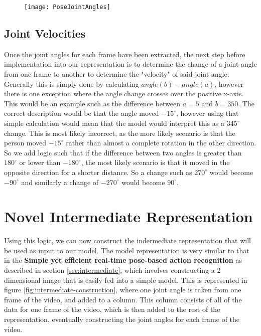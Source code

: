 \begin{figure}[ht]
	\texttt{[image: PoseJointAngles]}
	\centering
	\caption{}
	\label{fig:pose-joint-angles}
\end{figure}

\subsection{Joint Velocities}
\label{sec:joint-velocities}

Once the joint angles for each frame have been extracted, the next step before implementation into our representation is to determine the change of a joint angle from one frame to another to determine the "velocity" of said joint angle. Generally this is simply done by calculating $angle(b) - angle(a)$, however there is one exception where the angle change crosses over the positive x-axis. This would be an example such as the difference between $a = 5$ and $b = 350$. The correct description would be that the angle moved $-15^\circ$, however using that simple calculation would mean that the model would interpret this as a $345^\circ$ change. This is most likely incorrect, as the more likely scenario is that the person moved $-15^\circ$ rather than almost a complete rotation in the other direction. So we add logic such that if the difference between two angles is greater than $180^\circ$ or lower than $-180^\circ$, the most likely scenario is that it moved in the opposite direction for a shorter distance. So a change such as $270^\circ$ would become $-90^\circ$ and similarly a change of $-270^\circ$ would become $90^\circ$.

\section{Novel Intermediate Representation}

Using this logic, we can now construct the indermediate representation that will be used as input to our model. The model representation is very similar to that in the \textbf{Simple yet efficient real-time pose-based action recognition} \cite{simple_yet_efficient} as described in section \ref{sec:intermediate}, which involves constructing a 2 dimensional image that is easily fed into a simple model. This is represented in figure \ref{fig:intermediate-construction}, where one joint angle is taken from one frame of the video, and added to a column. This column consists of all of the data for one frame of the video, which is then added to the rest of the representation, eventually constructing the joint angles for each frame of the video.

